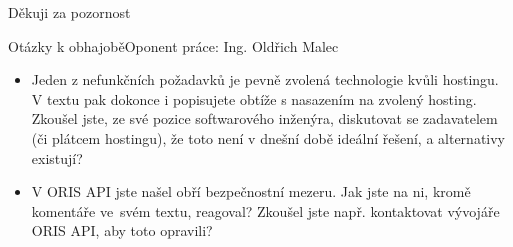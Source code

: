 \documentclass[aspectratio=169]{beamer}
\begin{document}
\begin{frame}
    \centering
    \vspace{10pt}
    \Huge Děkuji za pozornost
\end{frame}

\appendix

\begin{frame}{Otázky k obhajobě}{Oponent práce: Ing. Oldřich Malec}
    \begin{itemize}
        \justifying
        \item Jeden z nefunkčních požadavků je pevně zvolená technologie kvůli hostingu. V textu pak dokonce i popisujete obtíže s nasazením na zvolený hosting. Zkoušel jste, ze své pozice softwarového inženýra, diskutovat se zadavatelem (či plátcem hostingu), že toto není v dnešní době ideální řešení, a alternativy existují?
        \vspace{10pt}
        \item V ORIS API jste našel obří bezpečnostní mezeru. Jak jste na ni, kromě komentáře ve~svém textu, reagoval? Zkoušel jste např. kontaktovat vývojáře ORIS API, aby toto opravili?
    \end{itemize}
\end{frame}
\end{document}
